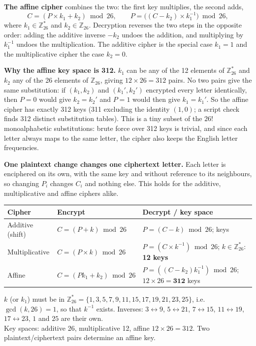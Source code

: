 \textbf{The affine cipher} combines the two: the first key multiplies, the second adds,
\[
C = (P \times k_1 + k_2) \bmod 26, \qquad P = \big((C - k_2) \times k_1^{-1}\big) \bmod 26 ,
\]
where $k_1 \in \mathbb{Z}_{26}^*$ and $k_2 \in \mathbb{Z}_{26}$. Decryption reverses the two steps in the opposite order: adding the additive inverse $-k_2$ undoes the addition, and multiplying by $k_1^{-1}$ undoes the multiplication. The additive cipher is the special case $k_1 = 1$ and the multiplicative cipher the case $k_2 = 0$.

\textbf{Why the affine key space is 312.} $k_1$ can be any of the 12 elements of $\mathbb{Z}_{26}^*$ and $k_2$ any of the 26 elements of $\mathbb{Z}_{26}$, giving $12 \times 26 = 312$ pairs. No two pairs give the same substitution: if $(k_1, k_2)$ and $(k_1', k_2')$ encrypted every letter identically, then $P = 0$ would give $k_2 = k_2'$ and $P = 1$ would then give $k_1 = k_1'$. So the affine cipher has exactly 312 keys (311 excluding the identity $(1, 0)$; a script check finds 312 distinct substitution tables). This is a tiny subset of the $26!$ monoalphabetic substitutions: brute force over 312 keys is trivial, and since each letter always maps to the same letter, the cipher also keeps the English letter frequencies.

\textbf{One plaintext change changes one ciphertext letter.} Each letter is enciphered on its own, with the same key and without reference to its neighbours, so changing $P_i$ changes $C_i$ and nothing else. This holds for the additive, multiplicative and affine ciphers alike.

\begin{center}\small
\begin{tabular}{@{}lll@{}}
\toprule
Cipher & Encrypt & Decrypt / key space\\
\midrule
Additive (shift) & $C = (P + k) \bmod 26$ & $P = (C - k) \bmod 26$; \; 26 keys\\
Multiplicative & $C = (P \times k) \bmod 26$ & $P = (C \times k^{-1}) \bmod 26$; \; $k \in \mathbb{Z}_{26}^*$: \textbf{12 keys}\\
Affine & $C = (P k_1 + k_2) \bmod 26$ & $P = ((C - k_2) k_1^{-1}) \bmod 26$; \; $12 \times 26 = \mathbf{312}$ keys\\
\bottomrule
\end{tabular}
\end{center}

\begin{mustknow}
$k$ (or $k_1$) must be in $\mathbb{Z}_{26}^* = \{1,3,5,7,9,11,15,17,19,21,23,25\}$, i.e.\ $\gcd(k, 26) = 1$, so that $k^{-1}$ exists. Inverses: $3 \leftrightarrow 9$, $5 \leftrightarrow 21$, $7 \leftrightarrow 15$, $11 \leftrightarrow 19$, $17 \leftrightarrow 23$, $1$ and $25$ are their own.\\
Key spaces: additive 26, multiplicative 12, affine $12 \times 26 = 312$. Two plaintext/ciphertext pairs determine an affine key.
\end{mustknow}

